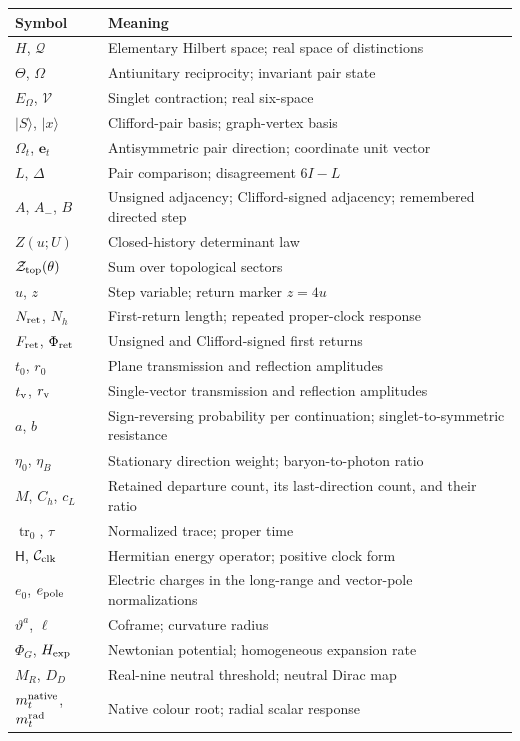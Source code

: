 \documentclass[aps,prx,reprint,longbibliography]{revtex4-2}
\providecommand{\trn}{\operatorname{tr}_0}
\providecommand{\Phis}{\Phi_{\rm ret}}
\providecommand{\Fret}{F_{\rm ret}}
\begin{document}
\begin{center}
\small
\begin{tabular}{@{}L{18mm}L{65mm}@{}}
\toprule
Symbol & Meaning\\\midrule
$H$, $\mathscr Q$ & Elementary Hilbert space; real space of distinctions\\
$\Theta$, $\Omega$ & Antiunitary reciprocity; invariant pair state\\
$E_\Omega$, $\mathscr V$ & Singlet contraction; real six-space\\
$|S\rangle$, $|x\rangle$ & Clifford-pair basis; graph-vertex basis\\
$\Omega_t$, $\mathbf e_t$ & Antisymmetric pair direction; coordinate unit vector\\
$L$, $\Delta$ & Pair comparison; disagreement $6I-L$\\
$A$, $A_-$, $B$ & Unsigned adjacency; Clifford-signed adjacency; remembered directed step\\
$Z(u;U)$ & Closed-history determinant law\\
$\mathcal Z_{\rm top}(\theta)$ & Sum over topological sectors\\
$u$, $z$ & Step variable; return marker $z=4u$\\
$N_{\rm ret}$, $N_h$ & First-return length; repeated proper-clock response\\
$\Fret$, $\Phis$ & Unsigned and Clifford-signed first returns\\
$t_0$, $r_0$ & Plane transmission and reflection amplitudes\\
$t_{\rm v}$, $r_{\rm v}$ & Single-vector transmission and reflection amplitudes\\
$a$, $b$ & Sign-reversing probability per continuation; singlet-to-symmetric resistance\\
$\eta_0$, $\eta_B$ & Stationary direction weight; baryon-to-photon ratio\\
$M$, $C_h$, $c_L$ & Retained departure count, its last-direction count, and their ratio\\
$\trn$, $\tau$ & Normalized trace; proper time\\
$\mathsf H$, $\mathcal C_{\rm clk}$ & Hermitian energy operator; positive clock form\\
$e_0$, $e_{\rm pole}$ & Electric charges in the long-range and vector-pole normalizations\\
$\vartheta^a$, $\ell$ & Coframe; curvature radius\\
$\Phi_G$, $H_{\rm exp}$ & Newtonian potential; homogeneous expansion rate\\
$M_R$, $D_D$ & Real-nine neutral threshold; neutral Dirac map\\
$m_t^{\rm native}$, $m_t^{\rm rad}$ & Native colour root; radial scalar response\\
\bottomrule
\end{tabular}
\end{center}
\end{document}
